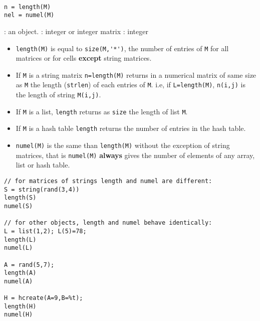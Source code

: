 
\begin{mandesc}
   \\
\end{mandesc}
\begin{calling_sequence}
\begin{verbatim}
n = length(M)   
nel = numel(M)   
\end{verbatim}
\end{calling_sequence}

\begin{parameters}
  \begin{varlist}
    : an object.
    : integer or integer matrix
    : integer
  \end{varlist}
\end{parameters}

\begin{mandescription}
\begin{itemize}
  \item \verb!length(M)! is equal to \verb!size(M,'*')!, the number of entries of \verb!M! for all matrices 
    or for cells {\bf except} string matrices.
  \item If \verb+M+ is a string matrix \verb+n=length(M)+ returns in a  numerical matrix of same size 
    as \verb+M+ the length (\verb+strlen+) of each entries of \verb+M+. i.e, if \verb+L=length(M)+, 
    \verb+n(i,j)+ is the length of string \verb+M(i,j)+.
  \item If \verb+M+ is a list, \verb+length+ returns as \verb+size+ the length of list \verb+M+.
  \item If \verb+M+ is a hash table \verb+length+ returns the number of entries in the hash table.
  \item \verb!numel(M)! is the same than \verb!length(M)! without the exception of string matrices, that
        is \verb!numel(M)! {\bf always} gives the number of elements of any array, list or hash table.
\end{itemize}
\end{mandescription}

\begin{examples}
\begin{Verbatim}
// for matrices of strings length and numel are different: 
S = string(rand(3,4))
length(S)
numel(S)

// for other objects, length and numel behave identically:
L = list(1,2); L(5)=78; 
length(L)
numel(L)

A = rand(5,7);
length(A)
numel(A)
    
H = hcreate(A=9,B=%t);
length(H)
numel(H)
\end{Verbatim}
\end{examples}

\begin{manseealso}
\end{manseealso}

